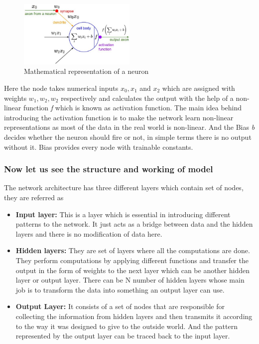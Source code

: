 \begin{figure}
    \centering
    \includegraphics[width=0.5\textwidth]{thesis_template/images/Mathmodel.png}
    \caption{Mathematical representation of a neuron}
    \label{}
\end{figure}


 Here the node takes numerical inputs $\mathit{x_0,x_1}$ and  $\mathit{x_2}$ which are assigned with weights $\mathit{w_1,w_2,w_2}$ respectively and calculates the output with the help of a non-linear function \textit{f} which is known as activation function. The main idea behind introducing the activation function is to make the network learn non-linear representations as most of the data in the real world is non-linear. And the Bias \textit{b} decides whether the neuron should fire or not, in simple terms there is no output without it. Bias provides every node with trainable constants.%
\subsubsection{\textbf{Now let us see the structure and working of model}}

The network architecture has three different layers which contain set of nodes, they are referred as
\begin{itemize}
    \item \textbf{Input layer:} This is a layer which is essential in introducing different patterns to the network. It just acts as a bridge between data and the hidden layers and there is no modification of data here.
    \item \textbf{Hidden layers:} They are set of layers where all the computations are done. They perform computations by applying different functions and transfer the output in the form of weights to the next layer which can be another hidden layer or output layer. There can be N number of hidden layers whose main job is to transform the data into something an output layer can use.
    \item \textbf{Output Layer:} It consists of a set of nodes that are responsible for collecting the information from hidden layers and then transmits it according to the way it was designed to give to the outside world. And the pattern represented by the output layer can be traced back to the input layer.
\end{itemize}



